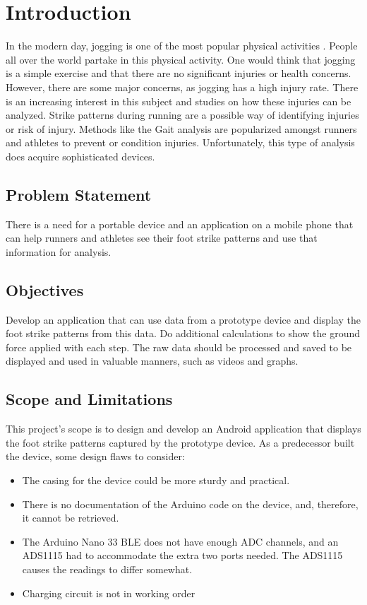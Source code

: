 \graphicspath{{introduction/fig/}}

\chapter{Introduction}
\label{chap:introduction}


In the modern day, jogging is one of the most popular physical activities \cite{statistaresearchdepartment2020}. People all over the world partake in this physical activity. One would think that jogging is a simple exercise and that there are no significant injuries or health concerns. However, there are some major concerns, as jogging has a high injury rate. There is an increasing interest in this subject and studies on how these injuries can be analyzed. Strike patterns during running are a possible way of identifying injuries or risk of injury. Methods like the Gait analysis are popularized amongst runners and athletes to prevent or condition injuries. Unfortunately, this type of analysis does acquire sophisticated devices.

\section{Problem Statement}
There is a need for a portable device and an application on a mobile phone that can help runners and athletes see their foot strike patterns and use that information for analysis. 
\section{Objectives}
Develop an application that can use data from a prototype device and display the foot strike patterns from this data. Do additional calculations to show the ground force applied with each step. The raw data should be processed and saved to be displayed and used in valuable manners, such as videos and graphs. 
\section{Scope and Limitations}
\label{limitations}
This project's scope is to design and develop an Android application that displays the foot strike patterns captured by the prototype device. As a predecessor built the device, some design flaws to consider:
\begin{itemize}
    \item The casing for the device could be more sturdy and practical.
    \item There is no documentation of the Arduino code on the device, and, therefore, it cannot be retrieved.
    \item The Arduino Nano 33 BLE does not have enough ADC channels, and an ADS1115 had to accommodate the extra two ports needed. The ADS1115 causes the readings to differ somewhat.
    \item Charging circuit is not in working order
  \end{itemize}

